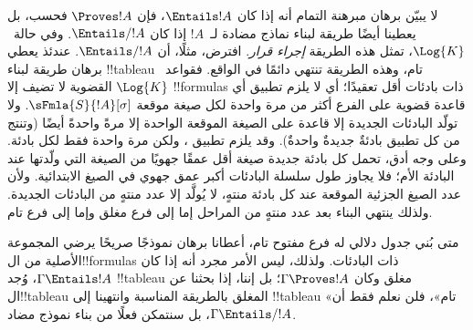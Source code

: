 \documentclass[../../../include/open-logic-section]{subfiles}
\begin{document}
      

\begin{explain}
  لا يبيّن برهان مبرهنة التمام أنه إذا كان $\Entails !A$، فإن
  $\Proves !A$ فحسب، بل يعطينا أيضًا طريقة لبناء نماذج مضادة لـ~$!A$
  إذا كان $\Entails/ !A$. وفي حالة~$\Log{K}$، تمثل هذه الطريقة
  \emph{إجراء قرار}. افترض، مثلًا، أن $\Entails/ !A$. عندئذ يعطي
  برهان  طريقة لبناء !!{tableau}
  تام، وهذه الطريقة تنتهي دائمًا في الواقع. فقواعد~$\Log{K}$ القضوية
  لا تضيف إلا !!{formula}s ذات بادئات أقل تعقيدًا؛ أي لا يلزم تطبيق
  أي قاعدة قضوية على الفرع أكثر من مرة واحدة لكل صيغة موقعة
  $\sFmla{S}{!A}[\sigma]$. ولا تولّد البادئات الجديدة إلا قاعدة
  على الصيغة الموقعة الواحدة إلا مرةً واحدةً أيضًا (وتنتج من كل تطبيق
  بادئةٌ جديدةٌ واحدةٌ).
  وقد يلزم تطبيق
  ، ولكن مرة واحدة
  فقط لكل بادئة. وعلى وجه أدق، تحمل كل بادئة جديدة صيغة أقل عمقًا جهويًا
  من الصيغة التي ولّدتها عند البادئة الأم؛ فلا يجاوز طول سلسلة البادئات
  أكبر عمق جهوي في الصيغ الابتدائية. ولأن عدد الصيغ الجزئية الموقعة عند
  كل بادئة منتهٍ، لا يُولَّد إلا عدد منتهٍ من البادئات الجديدة. ولذلك
  ينتهي البناء بعد عدد منتهٍ من المراحل إما إلى فرع مغلق وإما إلى فرع تام.

  متى بُني جدول دلالي له فرع مفتوح تام، أعطانا برهان
   نموذجًا صريحًا يرضي المجموعة
  الأصلية من ال!!{formula}s ذات البادئات. ولذلك، ليس الأمر مجرد أنه إذا
  كان $\Gamma \Entails !A$، وُجد !!{tableau} مغلق وكان
  $\Gamma \Proves !A$؛ بل إننا، إذا بحثنا عن ال!!{tableau} المغلق
  بالطريقة المناسبة وانتهينا إلى !!{tableau} «تام»، فلن نعلم فقط أن
  $\Gamma \Entails/ !A$، بل سنتمكن فعلًا من بناء نموذج مضاد.
\end{explain}
\end{document}
